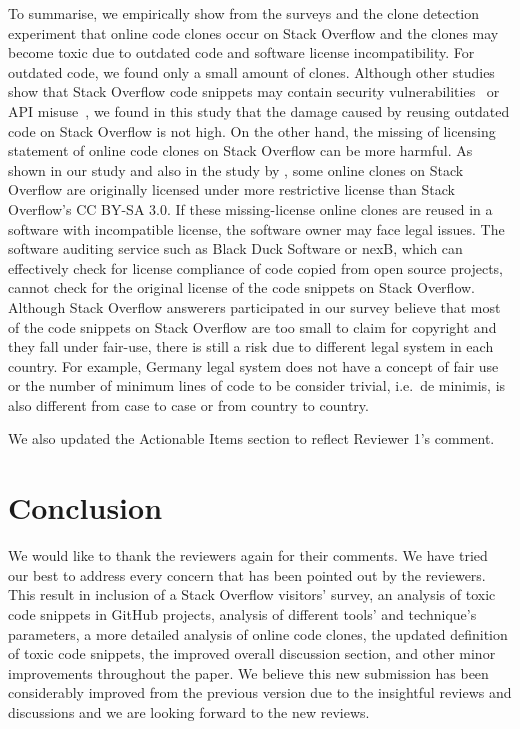\documentclass[a4paper,twoside,10pt]{reviewresponse}
\begin{document}
To summarise, we empirically show from the surveys and the clone detection experiment that online code clones occur on Stack Overflow and the clones may become toxic due to outdated code and software license incompatibility. 
For outdated code, we found only a small amount of clones. Although other studies show that Stack Overflow code snippets may contain security vulnerabilities~\citep{Acar2016,Fischer2017} or API misuse~\citep{Zhang2018}, we found in this study that the damage caused by reusing outdated code on Stack Overflow is not high. 
On the other hand, the missing of licensing statement of online code clones on Stack Overflow can be more harmful. As shown in our study and also in the study by \cite{An2017}, some online clones on Stack Overflow are originally licensed under more restrictive license than Stack Overflow's CC BY-SA 3.0. If these missing-license online clones are reused in a software with incompatible license, the software owner may face legal issues. The software auditing service such as Black Duck Software or nexB, which can effectively check for license compliance of code copied from open source projects, cannot check for the original license of the code snippets on Stack Overflow. Although Stack Overflow answerers participated in our survey believe that most of the code snippets on Stack Overflow are too small to claim for copyright and they fall under fair-use, there is still a risk due to different legal system in each country. For example, Germany legal system does not have a concept of fair use or the number of minimum lines of code to be consider trivial, i.e.~de minimis, is also different from case to case or from country to country. 

We also updated the Actionable Items section to reflect Reviewer 1's comment.

\vspace{1cm}

\section{Conclusion}
We would like to thank the reviewers again for their comments.
We have tried our best to address every concern that has been pointed out by the reviewers. This result in inclusion of a Stack Overflow visitors' survey, an analysis of toxic code snippets in GitHub projects, analysis of different tools' and technique's parameters, a more detailed analysis of online code clones, the updated definition of toxic code snippets, the improved overall discussion section, and other minor improvements throughout the paper.
We believe this new submission has been considerably improved from the previous version due to the insightful reviews and discussions and we are looking forward to the new reviews.

%


\end{document}

